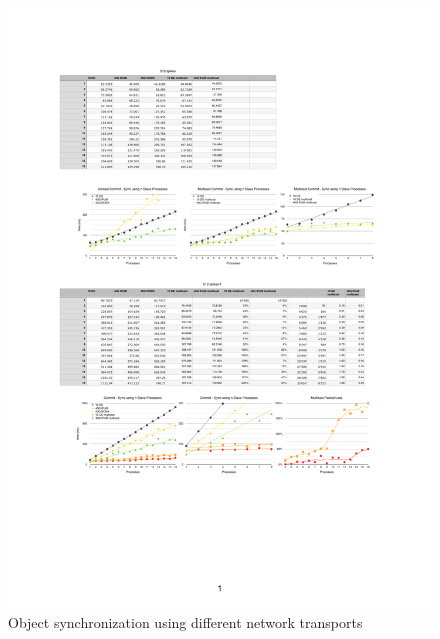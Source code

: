 \documentclass[10pt,journal,compsoc]{IEEEtran}
\begin{document}
\begin{figure}[p!]\center
  \includegraphics[height=.19\textheight]{images/ifdist}
  \caption{\label{fIFDist}Object synchronization using different network
    transports}
\end{figure}


\end{document}
